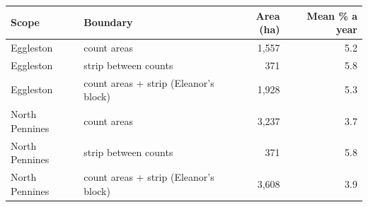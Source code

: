 \begin{tabular}{llrr}
\toprule
Scope & Boundary & Area (ha) & Mean \% a year \\
\midrule
Eggleston & count areas & 1,557 & 5.2 \\
Eggleston & strip between counts & 371 & 5.8 \\
Eggleston & count areas + strip (Eleanor's block) & 1,928 & 5.3 \\
North Pennines & count areas & 3,237 & 3.7 \\
North Pennines & strip between counts & 371 & 5.8 \\
North Pennines & count areas + strip (Eleanor's block) & 3,608 & 3.9 \\
\bottomrule
\end{tabular}

